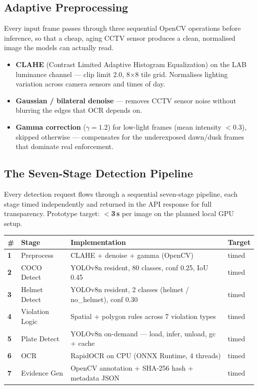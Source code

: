 \documentclass[11pt,a4paper]{article}
\begin{document}
\subsection{Adaptive Preprocessing}

Every input frame passes through three sequential OpenCV operations before inference, so that a cheap, aging CCTV sensor produces a clean, normalised image the models can actually read.

\begin{itemize}
  \item \textbf{CLAHE} (Contrast Limited Adaptive Histogram Equalization) on the LAB luminance channel — clip limit 2.0, 8$\times$8 tile grid. Normalises lighting variation across camera sensors and times of day.
  \item \textbf{Gaussian / bilateral denoise} — removes CCTV sensor noise without blurring the edges that OCR depends on.
  \item \textbf{Gamma correction} ($\gamma=1.2$) for low-light frames (mean intensity $<0.3$), skipped otherwise — compensates for the underexposed dawn/dusk frames that dominate real enforcement.
\end{itemize}

\subsection{The Seven-Stage Detection Pipeline}

Every detection request flows through a sequential seven-stage pipeline, each stage timed independently and returned in the API response for full transparency. Prototype target: \textbf{$<$3\,s} per image on the planned local GPU setup.

\begin{longtable}{@{}>{\bfseries}p{0.8cm}p{3.1cm}p{6.1cm}>{\raggedright\arraybackslash}p{1.7cm}@{}}
\hline
\textbf{\#} & \textbf{Stage} & \textbf{Implementation} & \textbf{Target} \\
\hline
1 & Preprocess & CLAHE + denoise + gamma (OpenCV) & timed \\
2 & COCO Detect & YOLOv8n resident, 80 classes, conf 0.25, IoU 0.45 & timed \\
3 & Helmet Detect & YOLOv8n resident, 2 classes (helmet / no\_helmet), conf 0.30 & timed \\
4 & Violation Logic & Spatial + polygon rules across 7 violation types & timed \\
5 & Plate Detect & YOLOv8n on-demand — load, infer, unload, gc + cache & timed \\
6 & OCR & RapidOCR on CPU (ONNX Runtime, 4 threads) & timed \\
7 & Evidence Gen & OpenCV annotation + SHA-256 hash + metadata JSON & timed \\
\hline
\end{longtable}
\end{document}
